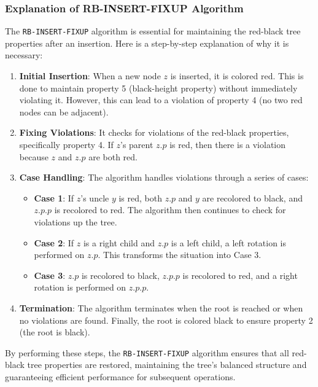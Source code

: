 \subsubsection*{Explanation of RB-INSERT-FIXUP Algorithm}

The \texttt{RB-INSERT-FIXUP} algorithm is essential for maintaining the red-black tree properties after an insertion. Here is a step-by-step explanation of why it is necessary:

\begin{enumerate}
    \item \textbf{Initial Insertion}: When a new node $z$ is inserted, it is colored red. This is done to maintain property 5 (black-height property) without immediately violating it. However, this can lead to a violation of property 4 (no two red nodes can be adjacent).
    \item \textbf{Fixing Violations}: It checks for violations of the red-black properties, specifically property 4. If $z$'s parent $z.p$ is red, then there is a violation because $z$ and $z.p$ are both red.
    \item \textbf{Case Handling}: The algorithm handles violations through a series of cases:

        \begin{itemize}
            \item \textbf{Case 1}: If $z$'s uncle $y$ is red, both $z.p$ and $y$ are recolored to black, and $z.p.p$ is recolored to red. The algorithm then continues to check for violations up the tree.

            \item \textbf{Case 2}: If $z$ is a right child and $z.p$ is a left child, a left rotation is performed on $z.p$. This transforms the situation into Case 3.

            \item \textbf{Case 3}: $z.p$ is recolored to black, $z.p.p$ is recolored to red, and a right rotation is performed on $z.p.p$.
        \end{itemize}

        \item \textbf{Termination}: The algorithm terminates when the root is reached or when no violations are found. Finally, the root is colored black to ensure property 2 (the root is black).
\end{enumerate}

By performing these steps, the \texttt{RB-INSERT-FIXUP} algorithm ensures that all red-black tree properties are restored, maintaining the tree's balanced structure and guaranteeing efficient performance for subsequent operations.

